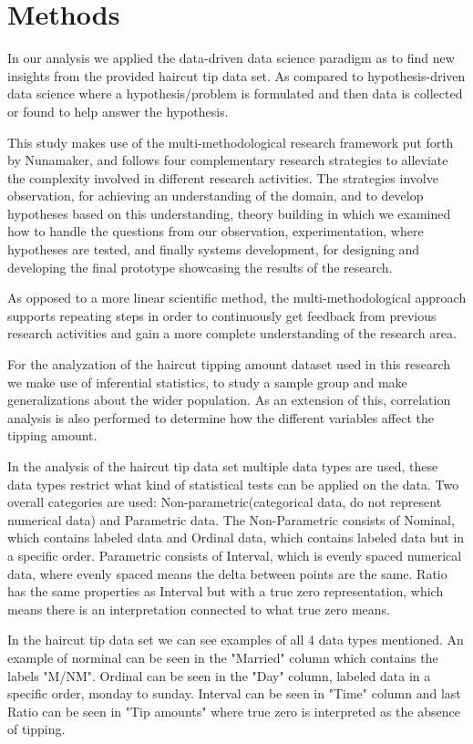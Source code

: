 \documentclass[twoside,twocolumn]{article}
\begin{document}
\section{Methods}
In our analysis we applied the data-driven data science paradigm as to find new insights from the provided haircut tip data set.
As compared to hypothesis-driven data science where a hypothesis/problem is formulated and then data is collected or found to help answer the hypothesis.

This study makes use of the multi-methodological research framework put forth by Nunamaker, and follows four complementary research strategies to alleviate the complexity involved in different research activities. The strategies involve observation, for achieving an understanding of the domain, and to develop hypotheses based on this understanding, theory building in which we examined how to handle the questions from our observation, experimentation, where hypotheses are tested, and finally systems development, for designing and developing the final prototype showcasing the results of the research.

As opposed to a more linear scientific method, the multi-methodological approach supports repeating steps in order to continuously get feedback from previous research activities and gain a more complete understanding of the research area.

For the analyzation of the haircut tipping amount dataset used in this research we make use of inferential statistics, to study a sample group and make generalizations about the wider population. As an extension of this, correlation analysis is also performed to determine how the different variables affect the tipping amount.

In the analysis of the haircut tip data set multiple data types are used, these data types restrict what kind of statistical tests can be applied on the data. Two overall categories are used: Non-parametric(categorical data, do not represent numerical data) and Parametric data. The Non-Parametric consists of Nominal, which contains labeled data and Ordinal data, which contains labeled data but in a specific order. Parametric consists of Interval, which is evenly spaced numerical data, where evenly spaced means the delta between points are the same. Ratio has the same properties as Interval but with a true zero representation, which means there is an interpretation connected to what true zero means.

In the haircut tip data set we can see examples of all 4 data types mentioned. An example of norminal can be seen in the "Married" column which contains the labels "M/NM". Ordinal can be seen in the "Day" column, labeled data in a specific order, monday to sunday. Interval can be seen in "Time" column and last Ratio can be seen in "Tip amounts" where true zero is interpreted as the absence of tipping.
\end{document}
